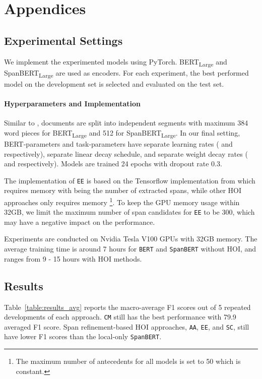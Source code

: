 \documentclass[11pt,a4paper]{article}
\begin{document}
\section{Appendices}
\label{sec:appendix}

\subsection{Experimental Settings}
\label{append:experiments}

We implement the experimented models using PyTorch. BERT\textsubscript{Large} and SpanBERT\textsubscript{Large} are used as encoders. For each experiment, the best performed model on the development set is selected and evaluated on the test set.


\paragraph{Hyperparameters and Implementation}
Similar to \citet{joshi-etal-2019-bert,spanbert-joshi}, documents are split into independent segments with maximum 384 word pieces for BERT\textsubscript{Large} and 512 for SpanBERT\textsubscript{Large}. In our final setting, BERT-parameters and task-parameters have separate learning rates ( and  respectively), separate linear decay schedule, and separate weight decay rates ( and  respectively). Models are trained 24 epochs with dropout rate 0.3.

The implementation of \texttt{EE} is based on the Tensorflow implementation from \citet{kantor-globerson-2019-coreference} which requires  memory with  being the number of extracted spans, while other HOI approaches only requires  memory \footnote{The maximum number of antecedents for all models is set to 50 which is constant.}. To keep the GPU memory usage within 32GB, we limit the maximum number of span candidates for \texttt{EE} to be 300, which may have a negative impact on the performance.

Experiments are conducted on Nvidia Tesla V100 GPUs with 32GB memory. The average training time is around 7 hours for \texttt{BERT} and \texttt{SpanBERT} without HOI, and ranges from 9 - 15 hours with HOI methods.

\subsection{Results}
\label{append:results}

Table~\ref{table:results_avg} reports the macro-average F1 scores out of 5 repeated developments of each approach. \texttt{CM} still has the best performance with 79.9 averaged F1 score. Span refinement-based HOI approaches, \texttt{AA}, \texttt{EE}, and \texttt{SC}, still have lower F1 scores than the local-only \texttt{SpanBERT}.
\end{document}
